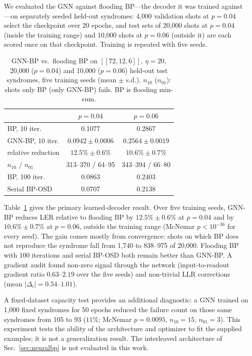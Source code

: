 \documentclass[a4paper,twocolumn,11pt,nopdfoutputerror]{quantumarticle}
\newcommand{\code}[3]{\ensuremath{[\![#1,#2,#3]\!]}}
\begin{document}
We evaluated the GNN against flooding BP---the decoder it was
trained against---on separately seeded held-out syndromes: 4{,}000
validation shots at $p=0.04$ select the checkpoint over 20 epochs, and
test sets of 20{,}000 shots at $p=0.04$ (inside the training range) and
10{,}000 shots at $p=0.06$ (outside it) are each scored once on that
checkpoint. Training is repeated with five seeds.

\begin{table}[t]
\centering
\caption{GNN-BP vs.\ flooding BP on $\code{72}{12}{6}$, $\eta=20$,
         20{,}000 ($p=0.04$) and 10{,}000 ($p=0.06$) held-out test
         syndromes, five training seeds (mean $\pm$ s.d.). $n_{10}$
         ($n_{01}$): shots only BP (only GNN-BP) fails. BP is flooding
         min-sum.}
\label{tab:gnn_flooding}
\footnotesize
\setlength{\tabcolsep}{3.5pt}
\begin{tabular}{@{}lcc@{}}
\toprule
 & $p=0.04$ & $p=0.06$ \\
\midrule
BP, 10 iter.                 & 0.1077 & 0.2867 \\
GNN-BP, 10 iter.             & $0.0942\pm0.0006$ & $0.2564\pm0.0019$ \\
\quad relative reduction     & $12.5\%\pm0.6\%$ & $10.6\%\pm0.7\%$ \\
\quad $n_{10}$ / $n_{01}$    & 313--370 / 64--95 & 343--394 / 66--80 \\
BP, 100 iter.                & 0.0863 & 0.2403 \\
Serial BP-OSD                & 0.0707 & 0.2138 \\
\bottomrule
\end{tabular}
\end{table}

Table~\ref{tab:gnn_flooding} gives the primary learned-decoder result.
Over five training seeds, GNN-BP reduces LER relative to flooding BP by
$12.5\%\pm0.6\%$ at $p=0.04$ and by $10.6\%\pm0.7\%$ at $p=0.06$, outside
the training range (McNemar $p<10^{-36}$ for every seed). The gain comes
mostly from convergence: shots on which BP does not reproduce the
syndrome fall from 1{,}740 to 838--975 of 20{,}000. Flooding BP with 100
iterations and serial BP-OSD both remain better than GNN-BP. A gradient audit found non-zero
signal through the network (input-to-readout gradient ratio $0.63$--$2.19$
over the five seeds) and non-trivial LLR corrections (mean
$|\Delta_i|=0.54$--$1.01$).

A fixed-dataset capacity test provides an additional diagnostic: a GNN
trained on 1{,}000 fixed syndromes for 50 epochs reduced the failure
count on those same syndromes from 105 to 93 ($11\%$; McNemar
$p=0.0095$, $n_{10}=15$, $n_{01}=3$). This experiment tests the ability of
the architecture and optimizer to fit the supplied examples; it is not a
generalization result. The interleaved architecture of
Sec.~\ref{sec:neuralbp} is not evaluated in this work.
\end{document}
